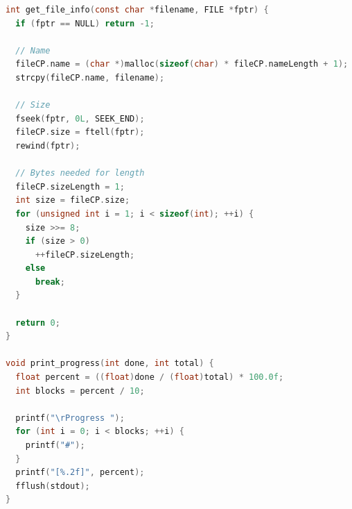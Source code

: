 \documentclass[11pt]{article}
\begin{document}
\begin{lstlisting}[language=C]
int get_file_info(const char *filename, FILE *fptr) {
  if (fptr == NULL) return -1;

  // Name
  fileCP.name = (char *)malloc(sizeof(char) * fileCP.nameLength + 1);
  strcpy(fileCP.name, filename);

  // Size
  fseek(fptr, 0L, SEEK_END);
  fileCP.size = ftell(fptr);
  rewind(fptr);

  // Bytes needed for length
  fileCP.sizeLength = 1;
  int size = fileCP.size;
  for (unsigned int i = 1; i < sizeof(int); ++i) {
    size >>= 8;
    if (size > 0)
      ++fileCP.sizeLength;
    else
      break;
  }

  return 0;
}

void print_progress(int done, int total) {
  float percent = ((float)done / (float)total) * 100.0f;
  int blocks = percent / 10;

  printf("\rProgress ");
  for (int i = 0; i < blocks; ++i) {
    printf("#");
  }
  printf("[%.2f]", percent);
  fflush(stdout);
}

\end{lstlisting}
\end{document}
